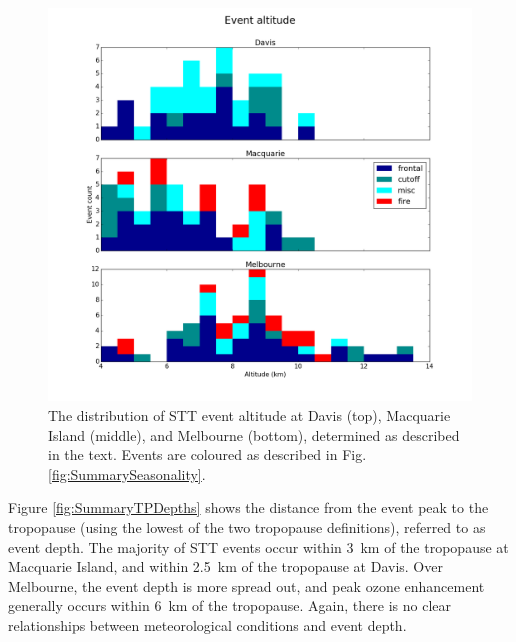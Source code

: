   \begin{figure}[t]
    \includegraphics[width=12cm]{figures/summary_altitude.png}
    \caption{The distribution of STT event altitude at Davis (top), Macquarie Island (middle), and Melbourne (bottom), determined as described in the text.
    Events are coloured as described in Fig. \ref{fig:SummarySeasonality}.}
    \label{fig:SummaryAltitudes}
  \end{figure}

  Figure \ref{fig:SummaryTPDepths} shows the distance from the event peak to the tropopause (using the lowest of the two tropopause definitions), referred to as event depth.
  The majority of STT events occur within 3~km of the tropopause at Macquarie Island, and within 2.5~km of the tropopause at Davis. 
  Over Melbourne, the event depth is more spread out, and peak ozone enhancement generally occurs within 6~km of the tropopause.
  Again, there is no clear relationships between meteorological conditions and event depth.

